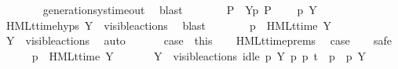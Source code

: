 \begin{isabellebody}
\ \ \ \ \ \ \isamarkupfalse%
\ generation{\isacharunderscore}{\kern0pt}sys{\isacharunderscore}{\kern0pt}timeout\ \isamarkupfalse%
\ blast\isanewline
\ \ \ \ \isamarkupfalse%
\ \isamarkupfalse%
\ {\isacartoucheopen}P{\isacharprime}{\kern0pt}\ {\isacharequal}{\kern0pt}\ {\isasymtheta}{\isacharbrackleft}{\kern0pt}Y{\isacharbrackright}{\kern0pt}{\isacharparenleft}{\kern0pt}p{\isacharprime}{\kern0pt}{\isacharparenright}{\kern0pt}{\isacartoucheclose}\ {\isacartoucheopen}P{\isacharprime}{\kern0pt}\ {\isasymTurnstile}\ {\isasymsigma}{\isacharparenleft}{\kern0pt}{\isasymphi}{\isacharparenright}{\kern0pt}{\isacartoucheclose}\ \isamarkupfalse%
\ {\isacartoucheopen}p{\isacharprime}{\kern0pt}\ {\isasymTTurnstile}{\isacharbrackleft}{\kern0pt}Y{\isacharbrackright}{\kern0pt}\ {\isasymphi}{\isacartoucheclose}\ \isanewline
\ \ \ \ \ \ \isamarkupfalse%
\ HMLt{\isacharunderscore}{\kern0pt}time{\isachardot}{\kern0pt}hyps\ {\isacartoucheopen}Y\ {\isasymsubseteq}\ visible{\isacharunderscore}{\kern0pt}actions{\isacartoucheclose}\ \isamarkupfalse%
\ blast\isanewline
\ \ \ \ \isamarkupfalse%
\ \isamarkupfalse%
\ {\isacartoucheopen}p\ {\isasymTTurnstile}\ HMLt{\isacharunderscore}{\kern0pt}time\ Y\ {\isasymphi}{\isacartoucheclose}\ \isamarkupfalse%
\ {\isacartoucheopen}Y\ {\isasymsubseteq}\ visible{\isacharunderscore}{\kern0pt}actions{\isacartoucheclose}\ \isamarkupfalse%
\ auto\isanewline
\ \ \isacommand{{\isacharbraceright}{\kern0pt}}\isamarkupfalse%
\isanewline
\ \ \isamarkupfalse%
\ case{}\ {\isacharequal}{\kern0pt}\ this\isanewline
\isanewline
\ \ \isamarkupfalse%
\ HMLt{\isacharunderscore}{\kern0pt}time{\isachardot}{\kern0pt}prems\ \isamarkupfalse%
\ {\isacharquery}{\kern0pt}case\isanewline
\ \ \isamarkupfalse%
\ safe\isanewline
\ \ \ \ \isamarkupfalse%
\ {\isacartoucheopen}p\ {\isasymTTurnstile}\ HMLt{\isacharunderscore}{\kern0pt}time\ Y\ {\isasymphi}{\isacartoucheclose}\isanewline
\ \ \ \ \isamarkupfalse%
\ {\isacartoucheopen}Y\ {\isasymsubseteq}\ visible{\isacharunderscore}{\kern0pt}actions{\isacartoucheclose}\ {\isacartoucheopen}idle\ p\ Y{\isacartoucheclose}\ {\isacartoucheopen}{\isasymexists}p{\isacharprime}{\kern0pt}{\isachardot}{\kern0pt}\ p\ {\isasymlongmapsto}t\ \ p{\isacharprime}{\kern0pt}\ {\isasymand}\ p{\isacharprime}{\kern0pt}\ {\isasymTTurnstile}{\isacharbrackleft}{\kern0pt}Y{\isacharbrackright}{\kern0pt}\ {\isasymphi}{\isacartoucheclose}\ \isamarkupfalse%

\end{isabellebody}
